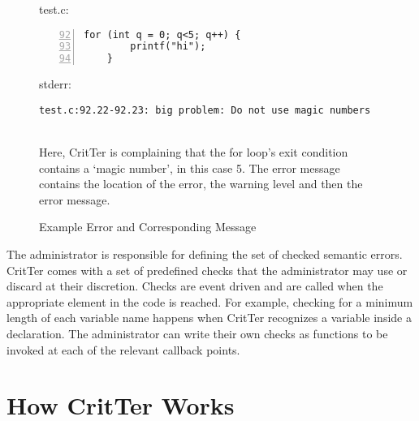 \documentclass[12pt]{report}
\newcommand{\programName}{CritTer\xspace}
\begin{document}
\begin{figure}
\caption{Example Error and Corresponding Message}
\label{errorExample}
\vspace{2mm}
\begin{minipage}[b]{0.5\textwidth}
\hspace{1mm} test.c:
\begin{lstlisting}[numbers=left, firstnumber=92,xleftmargin=1cm]
	for (int q = 0; q<5; q++) {
		printf("hi");
	}
\end{lstlisting}
\end{minipage}
\hspace{-10mm}
\begin{minipage}[b]{0.5\textwidth}
\hspace{8mm} stderr:
\begin{lstlisting}[xleftmargin=1cm]
test.c:92.22-92.23: big problem: Do not use magic numbers
\end{lstlisting}
\end{minipage} \\
\small{Here, \programName is complaining that the for loop's exit condition contains a `magic number', in this case 5. The error message contains the location of the error, the warning level and then the error message.}
\end{figure}

The administrator is responsible for defining the set of checked semantic errors. \programName 
comes with a set of predefined checks that the administrator may use or discard at their discretion. 
Checks are event driven and are called when the appropriate element in the code is reached. For 
example, checking for a minimum length of each variable name happens when \programName 
recognizes a variable inside a declaration. The administrator can write their own checks as functions 
to be invoked at each of the relevant callback points.

\chapter{How \programName Works}
\end{document}
